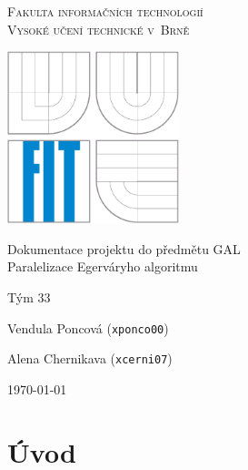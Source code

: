 \documentclass[a4paper, 11pt, titlepage, final]{article}[3. prosinec 2011]
\begin{document}

\begin{titlepage}
\begin{center}

\textsc{
\Large Fakulta informačních technologií 
\medskip\\
Vysoké učení technické v~Brně}


{\parbox{5cm}{\centering\includegraphics[height=5cm]{img/logo.eps}}}


{\LARGE Dokumentace projektu do předmětu GAL} \medskip \\
{\Large Paralelizace Egerváryho algoritmu} 



\end{center}

{\large
Tým 33

Vendula Poncová (\texttt{xponco00})

Alena Chernikava (\texttt{xcerni07})
} \hfill {\large\today}

\end{titlepage}


\setcounter{page}{1}

\section{Úvod}

\end{document}
